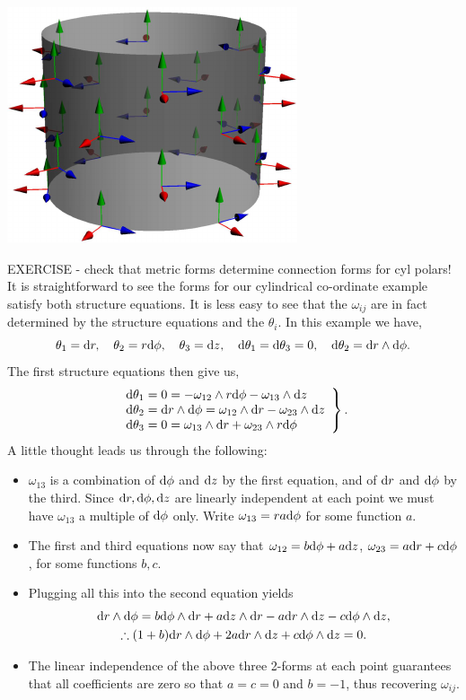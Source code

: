 	\href{http://www.math.uci.edu/~ndonalds/math162a/moving-cylinder.html}{\includegraphics{moving-cylinder}}

EXERCISE - check that metric forms determine connection forms for cyl polars!
It is straightforward to see the forms for our cylindrical co-ordinate example satisfy both structure equations. It is less easy to see that the $\omega_{ij}$ are in fact determined by the structure equations and the $\theta_i$. In this example we have,
\[\theta_1=\mathrm{d} r,\quad \theta_2=r\mathrm{d}\phi,\quad \theta_3=\mathrm{d} z,\quad \mathrm{d}\theta_1=\mathrm{d}\theta_3=0,\quad \mathrm{d}\theta_2=\mathrm{d} r\wedge\mathrm{d}\phi.\]
The first structure equations then give us,
\[\left.\begin{array}{l} 
\mathrm{d}\theta_1=0=-\omega_{12}\wedge r\mathrm{d}\phi-\omega_{13}\wedge\mathrm{d} z\\ 
\mathrm{d}\theta_2=\mathrm{d} r\wedge\mathrm{d}\phi=\omega_{12}\wedge\mathrm{d} r-\omega_{23}\wedge\mathrm{d} z\\ 
\mathrm{d}\theta_3=0=\omega_{13}\wedge\mathrm{d} r+\omega_{23}\wedge r\mathrm{d}\phi 
\end{array}\right\}.\]
A little thought leads us through the following:
\begin{itemize}
  \item $\omega_{13}$ is a combination of $\mathrm{d}\phi$ and ${\mathrm{d} z}$ by the first equation, and of $\mathrm{d} r$ and $\mathrm{d}\phi$ by the third. Since $\mathrm{d} r,\mathrm{d}\phi,{\mathrm{d} z}$ are linearly independent at each point we must have $\omega_{13}$ a multiple of $\mathrm{d}\phi$ only. Write $\omega_{13}=ra\mathrm{d}\phi$ for some function $a$.
  \item The first and third equations now say that $\omega_{12}=b\mathrm{d}\phi+a\mathrm{d} z$, $\omega_{23}=a\mathrm{d} r+c\mathrm{d}\phi$, for some functions $b,c$.
  \item Plugging all this into the second equation yields
  \begin{gather*}
  \mathrm{d} r\wedge\mathrm{d}\phi=b\mathrm{d}\phi\wedge\mathrm{d} r+a{\mathrm{d} z}\wedge\mathrm{d} r-a\mathrm{d} r\wedge\mathrm{d} z-c\mathrm{d}\phi\wedge{\mathrm{d}z},\\
  \therefore (1+b)\mathrm{d} r\wedge\mathrm{d}\phi+2a\mathrm{d} r\wedge{\mathrm{d}z}+c\mathrm{d}\phi\wedge{\mathrm{d}z}=0.
  \end{gather*}
  \item The linear independence of the above three 2-forms at each point guarantees that all coefficients are zero so that $a=c=0$ and $b=-1$, thus recovering $\omega_{ij}$.
\end{itemize}



